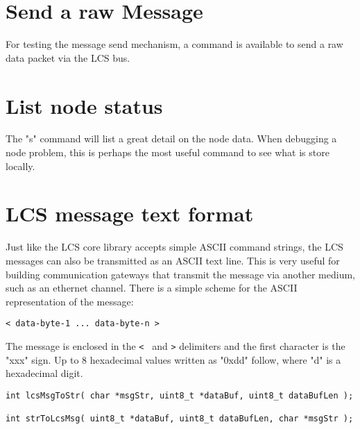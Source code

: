 
\section{Send a raw Message}

For testing the message send mechanism, a command is available to send a raw data packet via the LCS bus.


\section{List node status}

The "s" command will list a great detail on the node data. When debugging a node problem, this is perhaps the most useful command to see what is store locally.



\section{LCS message text format}

Just like the LCS core library accepts simple ASCII command strings, the LCS messages can also be transmitted as an ASCII text line. This is very useful for building communication gateways that transmit the message via another medium, such as an ethernet channel. There is a simple scheme for the ASCII representation of the message:

\lstset{style=codesnippetstyle}
\begin{lstlisting}
< data-byte-1 ... data-byte-n >
\end{lstlisting}


The message is enclosed in the \texttt{<}  and \texttt{>} delimiters and the first character is the "xxx" sign. Up to 8 hexadecimal values written as "0xdd" follow, where "d" is a hexadecimal digit.

\lstset{style=codesnippetstyle}
\begin{lstlisting}
int lcsMsgToStr( char *msgStr, uint8_t *dataBuf, uint8_t dataBufLen );

int strToLcsMsg( uint8_t *dataBuf, uint8_t dataBufLen, char *msgStr );
\end{lstlisting}


